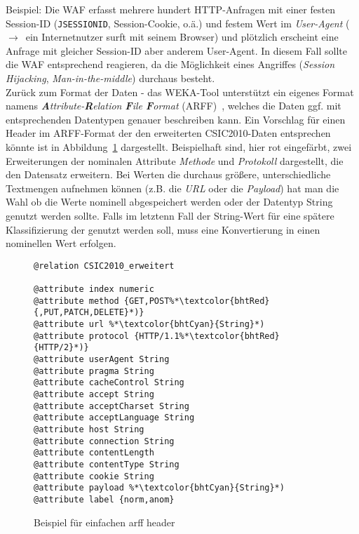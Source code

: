 \textcolor{bhtGray}{ Beispiel:} Die WAF erfasst mehrere hundert HTTP-Anfragen mit einer festen Session-ID (\verb=JSESSIONID=, Session-Cookie, o.ä.) und festem Wert im \emph{User-Agent} (~$\rightarrow$~ein Internetnutzer surft mit seinem Browser) und plötzlich erscheint eine Anfrage mit gleicher Session-ID aber anderem User-Agent. In diesem Fall sollte die WAF entsprechend reagieren, da die Möglichkeit eines Angriffes (\emph{Session Hijacking}, \emph{Man-in-the-middle}) durchaus besteht.\\
  
Zurück zum Format der Daten - das WEKA-Tool unterstützt ein eigenes Format namens \emph{\textbf{A}ttribute-\textbf{R}elation \textbf{F}ile \textbf{F}ormat} (ARFF)~\cite{arff2023}, welches die Daten ggf. mit entsprechenden Datentypen genauer beschreiben kann. Ein Vorschlag für einen Header im ARFF-Format der den erweiterten CSIC2010-Daten entsprechen könnte ist in Abbildung~\ref{fig:csicarff} dargestellt. Beispielhaft sind, hier rot eingefärbt, zwei Erweiterungen der nominalen Attribute \emph{Methode} und \emph{Protokoll} dargestellt, die den Datensatz erweitern. Bei Werten die durchaus größere, unterschiedliche Textmengen aufnehmen können (z.B. die \emph{URL} oder die \emph{Payload}) hat man die Wahl ob die Werte nominell abgespeichert werden oder der Datentyp String genutzt werden sollte. Falls im letztenn Fall der String-Wert für eine spätere Klassifizierung der genutzt werden soll, muss eine Konvertierung in einen nominellen Wert erfolgen.

\begin{figure}[h]
  \begin{lstlisting}
@relation CSIC2010_erweitert

@attribute index numeric
@attribute method {GET,POST%*\textcolor{bhtRed}{,PUT,PATCH,DELETE}*)}
@attribute url %*\textcolor{bhtCyan}{String}*)
@attribute protocol {HTTP/1.1%*\textcolor{bhtRed}{HTTP/2}*)}
@attribute userAgent String
@attribute pragma String
@attribute cacheControl String
@attribute accept String
@attribute acceptCharset String
@attribute acceptLanguage String
@attribute host String
@attribute connection String
@attribute contentLength 
@attribute contentType String
@attribute cookie String
@attribute payload %*\textcolor{bhtCyan}{String}*)
@attribute label {norm,anom}
\end{lstlisting}
  \caption{Beispiel für einfachen arff header}
  \label{fig:csicarff}
\end{figure}

